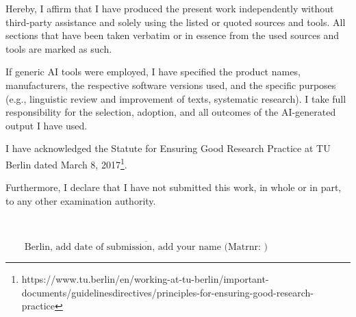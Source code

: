 

Hereby, I affirm that I have produced the present work independently without third-party assistance and solely using the listed or quoted sources and tools. All sections that have been taken verbatim or in essence from the used sources and tools are marked as such.

If generic AI tools were employed, I have specified the product names, manufacturers, the respective software versions used, and the specific purposes (e.g., linguistic review and improvement of texts, systematic research). I take full responsibility for the selection, adoption, and all outcomes of the AI-generated output I have used.

I have acknowledged the Statute for Ensuring Good Research Practice at TU Berlin dated March 8, 2017\footnote{https://www.tu.berlin/en/working-at-tu-berlin/important-documents/guidelinesdirectives/principles-for-ensuring-good-research-practice}.

Furthermore, I declare that I have not submitted this work, in whole or in part, to any other examination authority.

~~~\\

\vspace{5cm}

$\overline{~~~~~~~~~\mbox{Berlin, add date of submission, add your name (Matrnr: )}~~~~~~~~~}$


